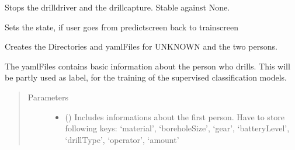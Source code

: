 \documentclass[letterpaper,10pt,english]{sphinxmanual}
\begin{document}
\begin{fulllineitems}
\begin{fulllineitems}
\end{fulllineitems}


\begin{fulllineitems}
\label{\detokenize{anoog.automation:anoog.automation.controller.Terminal.exit}}
\sphinxAtStartPar
Stops the drilldriver and the drillcapture. Stable against None.

\end{fulllineitems}


\begin{fulllineitems}
\label{\detokenize{anoog.automation:anoog.automation.controller.Terminal.from_predict_to_train}}
\sphinxAtStartPar
Sets the state, if user goes from predict\sphinxhyphen{}screen back to train\sphinxhyphen{}screen

\end{fulllineitems}


\begin{fulllineitems}
\label{\detokenize{anoog.automation:anoog.automation.controller.Terminal.init_drill}}
\sphinxAtStartPar
Creates the Directories and yaml\sphinxhyphen{}Files for UNKNOWN and the two persons.

\sphinxAtStartPar
The yaml\sphinxhyphen{}Files contains basic information about the person who drills.
This will be  partly used as label, for the training of the supervised classification models.
\begin{quote}\begin{description}
\item[{Parameters}] \leavevmode\begin{itemize}
\item {} 
\sphinxAtStartPar
{} () \textendash{} Includes informations about the first person. Have to store following keys: ‘material’, ‘boreholeSize’, ‘gear’, ‘batteryLevel’, ‘drillType’, ‘operator’, ‘amount’


\end{itemize}
\end{description}
\end{quote}
\end{fulllineitems}
\end{fulllineitems}
\end{document}
